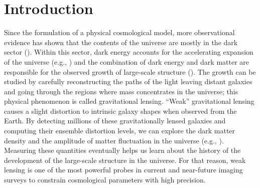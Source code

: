 \documentclass[fleqn,usenatbib]{mnras}
\begin{document}


\section{Introduction}

Since the formulation of a physical cosmological model, more observational evidence has shown that the contents of the universe are mostly in the dark sector (\citealt{2020A&A...633A..69H, 2018PhRvD..98d3528T, 2019PhRvL.122q1301A, 2019PASJ...71...43H, 2021A&A...645A.104A}). Within this sector, dark energy accounts for the accelerating expansion of the universe (e.g., \citealt{1998AJ....116.1009R, 1999AIPC..478..129P}) and the combination of dark energy and dark matter are responsible for the observed growth of large-scale structure (\citealt{2015RPPh...78h6901K, 2017grle.book.....D}). The growth can be studied by carefully reconstructing the paths of the light leaving distant galaxies and going through the regions where mass concentrates in the universe; this physical phenomenon is called gravitational lensing. “Weak” gravitational lensing causes a slight distortion to intrinsic galaxy shapes when observed from the Earth. By detecting millions of these gravitationally lensed galaxies and computing their ensemble distortion levels, we can explore the dark matter density and the amplitude of matter fluctuation in the universe (e.g., \citealt{2001PhR...340..291B}). Measuring these quantities eventually helps us learn about the history of the development of the large-scale structure in the universe. For that reason, weak lensing is one of the most powerful probes in current and near-future imaging surveys to constrain cosmological parameters with high precision. \par
\end{document}
